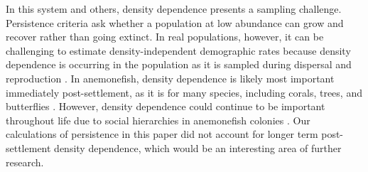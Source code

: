 \documentclass[12pt, oneside]{article}   	%
\begin{document}

In this system and others, density dependence presents a sampling challenge. Persistence criteria \citep{hastings_persistence_2006, burgess2014beyond} ask whether a population at low abundance can grow and recover rather than going extinct. In real populations, however, it can be challenging to estimate density-independent demographic rates because density dependence is occurring in the population as it is sampled during dispersal \citep{nowicki2011evidence} and reproduction \citep{rodenhouse2003multiple}. In anemonefish, density dependence is likely most important immediately post-settlement, as it is for many species, including corals, trees, and butterflies \citep{vermeij2008density, harms2000pervasive, nowicki2009relative}. However, density dependence could continue to be important throughout life due to social hierarchies in anemonefish colonies \citep{buston2011determinants}. Our calculations of persistence in this paper did not account for longer term post-settlement density dependence, which would be an interesting area of further research.
\end{document}

